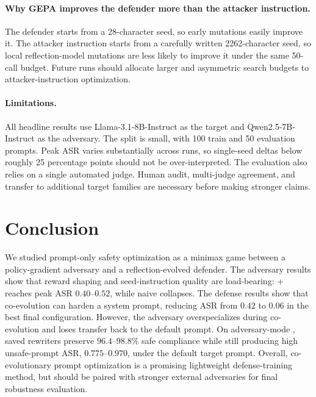 \paragraph{Why GEPA improves the defender more than the attacker instruction.}
The defender starts from a 28-character seed, so early mutations easily improve it. 
The attacker instruction starts from a carefully written 2262-character seed, so local reflection-model mutations are less likely to improve it under the same 50-call budget. 
Future runs should allocate larger and asymmetric search budgets to attacker-instruction optimization.

\paragraph{Limitations.}
All headline results use Llama-3.1-8B-Instruct as the target and Qwen2.5-7B-Instruct as the adversary. 
The \harmbench{} split is small, with 100 train and 50 evaluation prompts. 
Peak ASR varies substantially across runs, so single-seed deltas below roughly 25 percentage points should not be over-interpreted. 
The evaluation also relies on a single automated judge. 
Human audit, multi-judge agreement, and transfer to additional target families are necessary before making stronger claims.

\section{Conclusion}

We studied prompt-only safety optimization as a minimax game between a policy-gradient adversary and a reflection-evolved defender. 
The adversary results show that reward shaping and seed-instruction quality are load-bearing: \rloo{}+\lp{} reaches peak ASR $0.40$--$0.52$, while naive \reinforce{} collapses. 
The defense results show that co-evolution can harden a system prompt, reducing \harmbench{} ASR from $0.42$ to $0.06$ in the best final configuration. 
However, the adversary overspecializes during co-evolution and loses transfer back to the default prompt. 
On adversary-mode \xstest{}, saved rewriters preserve $96.4$--$98.8\%$ safe compliance while still producing high unsafe-prompt ASR, $0.775$--$0.970$, under the default target prompt. 
Overall, co-evolutionary prompt optimization is a promising lightweight defense-training method, but should be paired with stronger external adversaries for final robustness evaluation.




